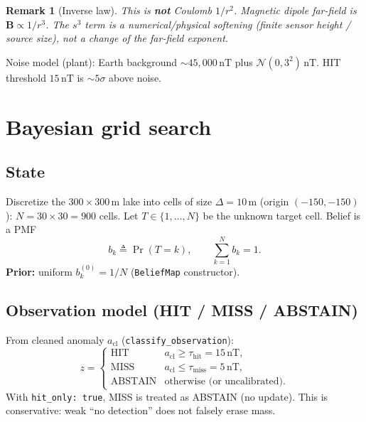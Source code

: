 \documentclass[11pt,a4paper]{article}
\newtheorem{remark}{Remark}
\begin{document}
\begin{remark}[Inverse law]
This is \textbf{not} Coulomb \(1/r^{2}\). Magnetic dipole far-field is
\(\mathbf{B}\propto 1/r^{3}\). The \(s^{3}\) term is a numerical/physical
softening (finite sensor height / source size), not a change of the far-field
exponent.
\end{remark}

Noise model (plant): Earth background \(\sim 45{,}000\,\mathrm{nT}\) plus
\(\mathcal{N}(0,3^{2})\,\mathrm{nT}\). HIT threshold \(15\,\mathrm{nT}\) is
\(\sim 5\sigma\) above noise.

\section{Bayesian grid search}
\label{sec:bayes}

\subsection{State}
Discretize the \(300\times300\,\mathrm{m}\) lake into cells of size
\(\Delta=10\,\mathrm{m}\) (origin \((-150,-150)\)): \(N=30\times30=900\) cells.
Let \(T\in\{1,\ldots,N\}\) be the unknown target cell. Belief is a PMF
\[
b_k \triangleq \Pr(T=k),\qquad \sum_{k=1}^{N} b_k=1.
\]
\textbf{Prior:} uniform \(b_k^{(0)}=1/N\) (\texttt{BeliefMap} constructor).

\subsection{Observation model (HIT / MISS / ABSTAIN)}
From cleaned anomaly \(a_{\mathrm{cl}}\) (\texttt{classify\_observation}):
\[
z=
\begin{cases}
\mathrm{HIT} & a_{\mathrm{cl}}\ge \tau_{\mathrm{hit}}=15\,\mathrm{nT},\\
\mathrm{MISS} & a_{\mathrm{cl}}\le \tau_{\mathrm{miss}}=5\,\mathrm{nT},\\
\mathrm{ABSTAIN} & \text{otherwise (or uncalibrated)}.
\end{cases}
\]
With \texttt{hit\_only: true}, MISS is treated as ABSTAIN (no update). This is
conservative: weak ``no detection'' does not falsely erase mass.
\end{document}
